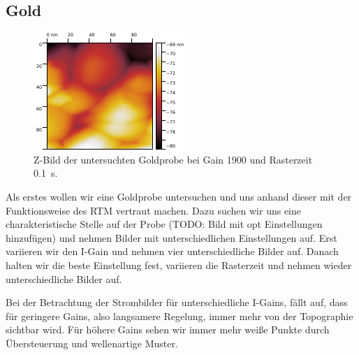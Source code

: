 \subsection{Gold}

\begin{figure}[H]
\centering
\includegraphics[width=\textwidth]{../Gwyddion/Gold/GAIN_opt_Z_forward.pdf}
\caption{Z-Bild der untersuchten Goldprobe bei Gain 1900 und Rasterzeit \SI{0.1}{s}.}
\label{GAIN_opt_Z}
\end{figure}

Als erstes wollen wir eine Goldprobe untersuchen und uns anhand dieser mit der Funktionsweise des RTM vertraut machen. Dazu suchen wir uns eine charakteristische Stelle auf der Probe (TODO: Bild mit opt Einstellungen hinzufügen) und nehmen Bilder mit unterschiedlichen Einstellungen auf. Erst variieren wir den I-Gain und nehmen vier unterschiedliche Bilder auf. Danach halten wir die beste Einstellung fest, variieren die Rasterzeit und nehmen wieder unterschiedliche Bilder auf.

Bei der Betrachtung der Strombilder für unterschiedliche I-Gains, fällt auf, dass für geringere Gains, also langsamere Regelung, immer mehr von der Topographie sichtbar wird. Für höhere Gains sehen wir immer mehr weiße Punkte durch Übersteuerung und wellenartige Muster.

